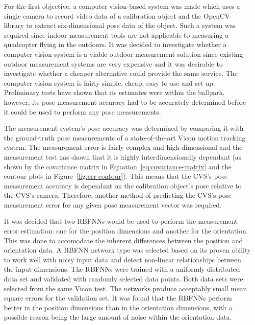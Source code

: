 For the first objective, a computer vision-based system was made which uses a single camera to record video data of a calibration object and the OpenCV library to extract six-dimensional pose data of the object. Such a system was required since indoor measurement tools are not applicable to measuring a quadcopter flying in the outdoors. It was decided to investigate whether a computer vision system is a viable outdoor measurement solution since existing outdoor measurement systems are very expensive and it was desirable to investigate whether a cheaper alternative could provide the same service. The computer vision system is fairly simple, cheap, easy to use and set up. Preliminary tests have shown that its estimates were within the ballpark, however, its pose measurement accuracy had to be accurately determined before it could be used to perform any pose measurements. 

The measurement system's pose accuracy was determined by comparing it with the ground-truth pose measurements of a state-of-the-art Vicon motion tracking system. The measurement error is fairly complex and high-dimensional and the measurement test has shown that it is highly interdimensionally dependant (as shown by the covariance matrix in Equation~\ref{eq:covariance-matrix} and the contour plots in Figure~\ref{fig:err-contour}). This means that the CVS's pose measurement accuracy is dependant on the calibration object's pose relative to the CVS's camera. Therefore, another method of predicting the CVS's pose measurement error for any given pose measurement vector was required.

It was decided that two RBFNNs would be used to perform the measurement error estimation: one for the position dimensions and another for the orientation. This was done to accomodate the inherent differences between the position and orientation data. A RBFNN network type was selected based on its proven ability to work well with noisy input data and detect non-linear relationships between the input dimensions. The RBFNNs were trained with a uniformly distributed data set and validated with randomly selected data points. Both data sets were selected from the same Vicon test. The networks produce acceptably small mean square errors for the validation set. It was found that the RBFNNs perform better in the position dimensions than in the orientation dimensions, with a possible reason being the large amount of noise within the orientation data. 

